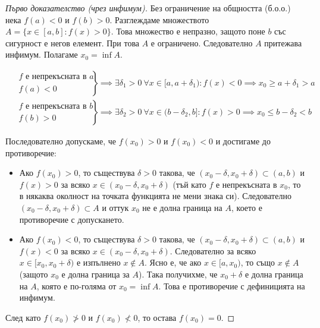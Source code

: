\begin{proof}[Първо доказателство (чрез инфимум)]
Без ограничение на общността (б.о.о.) нека $f(a) < 0$ и $f(b) > 0$. Разглеждаме множеството $A = \{x \in [a, b] : f(x) > 0\}$. Това множество е непразно, защото поне $b$ със сигурност е негов елемент. При това $A$ е ограничено. Следователно $A$ притежава инфимум. Полагаме $x_0 = \inf A$.

\begin{align*}
\left.
\begin{aligned}
&f \text{ е непрекъсната в } a \\
&f(a) < 0
\end{aligned}
\right\}
&\implies \exists \delta_1 > 0\ \forall x \in [a, a + \delta_1) : f(x) < 0 \implies x_0 \ge a + \delta_1 > a \\
\left.
\begin{aligned}
&f \text{ е непрекъсната в } b \\
&f(b) > 0
\end{aligned}
\right\}
&\implies \exists \delta_2 > 0\ \forall x \in (b - \delta_2, b] : f(x) > 0 \implies x_0 \le b - \delta_2 < b
\end{align*}

Последователно допускаме, че $f(x_0) > 0$ и $f(x_0) < 0$ и достигаме до противоречие:
\begin{itemize}
    \item Ако $f(x_0) > 0$, то съществува $\delta > 0$ такова, че $(x_0 - \delta, x_0 + \delta) \subset (a, b)$ и $f(x) > 0$ за всяко $x \in (x_0 - \delta, x_0 + \delta)$ (тъй като $f$ е непрекъсната в $x_0$, то в някаква околност на точката функцията не мени знака си). Следователно $(x_0 - \delta, x_0 + \delta) \subset A$ и оттук $x_0$ не е долна граница на $A$, което е противоречие с допускането.
    \item Ако $f(x_0) < 0$, то съществува $\delta > 0$ такова, че $(x_0 - \delta, x_0 + \delta) \subset (a, b)$ и $f(x) < 0$ за всяко $x \in (x_0 - \delta, x_0 + \delta)$. Следователно за всяко $x \in [x_0, x_0 + \delta)$ е изпълнено $x \notin A$. Ясно е, че ако $x \in [a, x_0)$, то също $x \notin A$ (защото $x_0$ е долна граница за $A$). Така получихме, че $x_0 + \delta$ е долна граница на $A$, която е по-голяма от $x_0 = \inf A$. Това е противоречие с дефиницията на инфимум.
\end{itemize}
След като $f(x_0) \not> 0$ и $f(x_0) \not< 0$, то остава $f(x_0) = 0$.
\end{proof}

